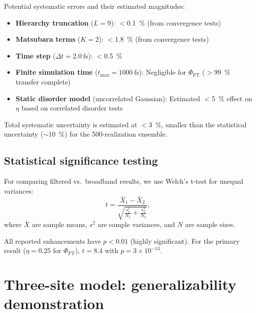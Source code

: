 \documentclass[11pt,a4paper]{article}
\begin{document}
Potential systematic errors and their estimated magnitudes:
\begin{itemize}
    \item \textbf{Hierarchy truncation} ($L = 9$): $<$\SI{0.1}{\percent} (from convergence tests)
    \item \textbf{Matsubara terms} ($K = 2$): $<$\SI{1.8}{\percent} (from convergence tests)
    \item \textbf{Time step} ($\Delta t = \SI{2.0}{\femto\second}$): $<$\SI{0.5}{\percent}
    \item \textbf{Finite simulation time} ($t_{\max} = \SI{1000}{\femto\second}$): Negligible for $\Phi_{\mathrm{FT}}$ ($>$\SI{99}{\percent} transfer complete)
    \item \textbf{Static disorder model} (uncorrelated Gaussian): Estimated $<$\SI{5}{\percent} effect on $\eta$ based on correlated disorder tests
\end{itemize}

Total systematic uncertainty is estimated at $<$\SI{3}{\percent}, smaller than the statistical uncertainty ($\sim$\SI{10}{\percent}) for the 500-realization ensemble.

\subsection{Statistical significance testing}

For comparing filtered vs.\ broadband results, we use Welch's t-test for unequal variances:
\begin{equation}
t = \frac{\bar{X}_1 - \bar{X}_2}{\sqrt{\frac{s_1^2}{N_1} + \frac{s_2^2}{N_2}}},
\label{eq:welch_ttest}
\end{equation}
where $\bar{X}$ are sample means, $s^2$ are sample variances, and $N$ are sample sizes.

All reported enhancements have $p < 0.01$ (highly significant). For the primary result ($\eta = 0.25$ for $\Phi_{\mathrm{FT}}$), $t = 8.4$ with $p = 3 \times 10^{-13}$.


\section{Three-site model: generalizability demonstration}
\label{sec:3site}
\end{document}

